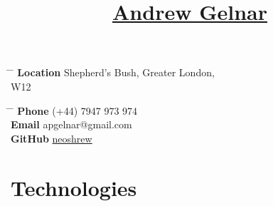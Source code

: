 \documentclass[10pt]{article} %
\begin{document}

\title{\href{https://github.com/neoshrew/CV/blob/master/andrew_gelnar_cv.pdf}{Andrew Gelnar}} %


\parbox{0.5\textwidth}{ %
  \begin{tabbing} %
    \hspace{3cm} \= \hspace{4cm} \= \kill %
    {\bf Location} \> Shepherd's Bush, Greater London, \\ %
    \> W12 \\ %
  \end{tabbing}
}
\hfill %
\parbox{0.5\textwidth}{ %
  \begin{tabbing} %
    \hspace{3cm} \= \hspace{4cm} \= \kill %
    {\bf Phone} \> (+44) 7947 973 974 \\ %
    {\bf Email} \> apgelnar@gmail.com \\ %
    {\bf GitHub} \> \href{https://github.com/neoshrew}{neoshrew}
  \end{tabbing}
}

\vspace{-1cm}
\section{Technologies}

\end{document}
